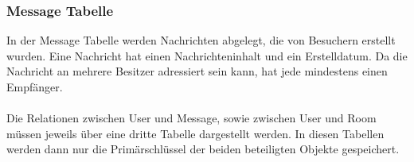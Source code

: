\subsubsection{Message Tabelle}\label{Message Tabelle}
In der Message Tabelle werden Nachrichten abgelegt, die von Besuchern erstellt wurden. Eine Nachricht hat einen Nachrichteninhalt und ein Erstelldatum. Da die Nachricht an mehrere Besitzer adressiert sein kann, hat jede mindestens einen Empfänger.
\\
\\
Die Relationen zwischen User und Message, sowie zwischen User und Room müssen jeweils über eine dritte Tabelle dargestellt werden. In diesen Tabellen werden dann nur die Primärschlüssel der beiden beteiligten Objekte gespeichert.



% 
